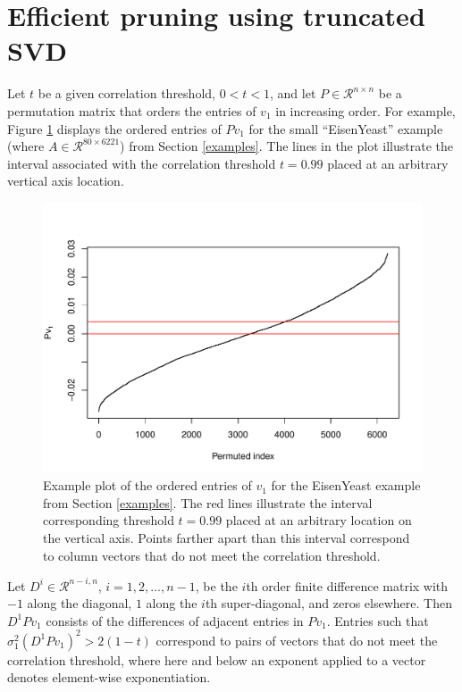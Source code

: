 \documentclass{article}
\numberwithin{algorithmctr}{section}
\begin{document}
\section{Efficient pruning using truncated SVD} \label{sect:algo}

Let $t$ be a given correlation threshold, $0<t<1$, and let
$P\in\mathcal{R}^{n\times n}$ be a permutation matrix that orders the entries
of $v_1$ in increasing order.  For example, Figure \ref{fig1} displays the
ordered entries of $Pv_1$ for the small ``EisenYeast'' example (where
$A\in\mathcal{R}^{80 \times 6221}$) from Section \ref{examples}.  The lines in
the plot illustrate the interval associated with the correlation threshold
$t=0.99$ placed at an arbitrary vertical axis location.

\begin{figure}[!ht]
\begin{center}
\includegraphics{draft-001}
\caption{
Example plot of the ordered entries of $v_1$ for the EisenYeast example from
Section \ref{examples}. The red lines illustrate the interval corresponding
threshold $t=0.99$ placed at an arbitrary location on the vertical axis. Points
farther apart than this interval correspond to column vectors that do not meet
the correlation threshold.
\label{fig1}
}
\end{center}
\end{figure}

Let $D^i\in\mathcal{R}^{n-i, n}$, $i=1,2,\ldots,n-1$, be the $i$th order finite
difference matrix with $-1$ along the diagonal, $1$ along the $i$th
super-diagonal, and zeros elsewhere.  Then $D^1P v_1$ consists of the
differences of adjacent entries in $P v_1$.  Entries such that $\sigma_1^2 (D^1
P v_1)^2 > 2(1-t)$ correspond to pairs of vectors that do not meet the
correlation threshold, where here and below an exponent applied to a vector
denotes element-wise exponentiation.
\end{document}
